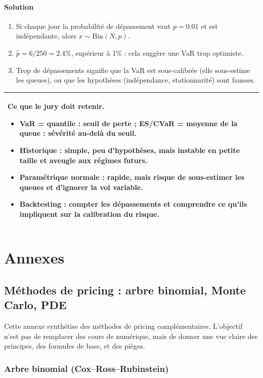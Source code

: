 \documentclass[11pt,a4paper]{report}
\newcommand{\1}{\mathbbm{1}}
\theoremstyle{definition}
\theoremstyle{plain}
\theoremstyle{remark}
\newenvironment{jurybox}{%
  \begin{center}
  \setlength{\tabcolsep}{6pt}%
  \renewcommand{\arraystretch}{1.1}%
  \begin{tabular}{|p{0.94\textwidth}|}
  \hline
  \small\textbf{Ce que le jury doit retenir.}\par\medskip
}{%
  \\ \hline
  \end{tabular}
  \end{center}
}
\begin{document}
\subsection*{Solution}
\begin{enumerate}[label=\alph*)]
  \item Si chaque jour la probabilité de dépassement vaut $p=0.01$ et est indépendante, alors $x\sim\mathrm{Bin}(N,p)$.
  \item $\hat{p}=6/250=2.4\%$, supérieur à 1\% : cela suggère une VaR trop optimiste.
  \item Trop de dépassements signifie que la VaR est sous-calibrée (elle sous-estime les queues), ou que les hypothèses (indépendance, stationnarité) sont fausses.
\end{enumerate}

\begin{jurybox}
\begin{itemize}
  \item VaR = quantile : seuil de perte ; ES/CVaR = moyenne de la queue : sévérité au-delà du seuil.
  \item Historique : simple, peu d'hypothèses, mais instable en petite taille et aveugle aux régimes futurs.
  \item Paramétrique normale : rapide, mais risque de sous-estimer les queues et d'ignorer la vol variable.
  \item Backtesting : compter les dépassements et comprendre ce qu'ils impliquent sur la calibration du risque.
\end{itemize}
\end{jurybox}

\appendix
\part{Annexes}

\chapter{Méthodes de pricing : arbre binomial, Monte Carlo, PDE}
\label{app:pricing_methods}

Cette annexe synthétise des méthodes de pricing complémentaires.
L'objectif n'est pas de remplacer des cours de numérique, mais de donner une vue claire des principes,
des formules de base, et des pièges.

\section{Arbre binomial (Cox--Ross--Rubinstein)}
\label{sec:crr}
\end{document}
